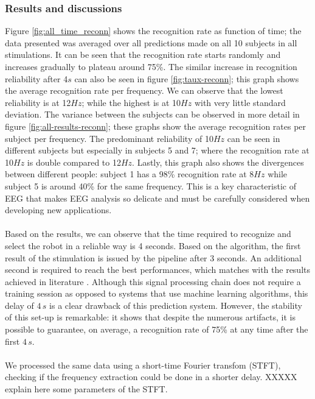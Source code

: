 \documentclass[smallextended]{svjour3}
\begin{document}
\subsubsection{Results and discussions}
Figure \ref{fig:all_time_reconn} shows the recognition rate as function of time; the data presented was averaged over all predictions made on all 10 subjects in all stimulations. It can be seen that the recognition rate starts randomly and increases gradually to plateau around 75\%. The similar increase in recognition reliability after 4$s$ can also be seen in figure \ref{fig:taux-reconn}; this graph shows the average recognition rate per frequency. We can observe that the lowest reliability is at 12$Hz$; while the highest is at 10$Hz$ with very little standard deviation. The variance between the subjects can be observed in more detail in figure \ref{fig:all-results-reconn}; these graphs show the average recognition rates per subject per frequency. The predominant reliability of 10$Hz$ can be seen in different subjects but especially in subjects 5 and 7; where the recognition rate at 10$Hz$ is double compared to 12$Hz$. Lastly, this graph also shows the divergences between different people: subject 1 has a 98\% recognition rate at 8$Hz$ while subject 5 is around 40\% for the same frequency. This is a key characteristic of EEG that makes EEG analysis so delicate and must be carefully considered when developing new applications.\\
\\
Based on the results, we can observe that the time required to recognize and select the robot in a reliable way is 4 seconds. 
Based on the algorithm, the first result of the stimulation is issued by the pipeline after 3 seconds. 
An additional second is required to reach the best performances, which matches with the results achieved in literature \cite{car,SSVEPfiability,jian2014improving,paper4}. 
Although this signal processing chain does not require a training session as opposed to systems that use machine learning algorithms, this delay of $4\,s$ is a clear drawback of this prediction system. 
However, the stability of this set-up is remarkable: it shows that despite the numerous artifacts, it is possible to guarantee, on average, a recognition rate of 75\% at any time after the first $4\,s$. \\
\\
We processed the same data using a short-time Fourier transfom (STFT), checking if the frequency extraction could be done in a shorter delay. 
XXXXX explain here some parameters of the STFT.
\end{document}

